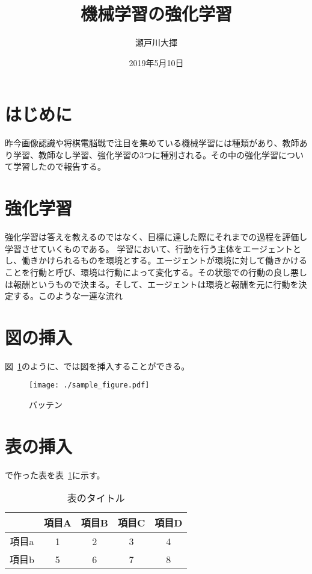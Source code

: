 \documentclass[10pt, a4j, uplatex, dvipdfmx, twocolumn]{jsarticle}
\title{機械学習の強化学習}   %
\author{瀬戸川大揮}                                %
\date{2019年5月10日}                            %
\begin{document}
\maketitle

\section{はじめに}

昨今画像認識や将棋電脳戦で注目を集めている機械学習には種類があり、教師あり学習、教師なし学習、強化学習の3つに種別される。その中の強化学習について学習したので報告する。

\section{強化学習}

強化学習は答えを教えるのではなく、目標に達した際にそれまでの過程を評価し学習させていくものである。
学習において、行動を行う主体をエージェントとし、働きかけられるものを環境とする。エージェントが環境に対して働きかけることを行動と呼び、環境は行動によって変化する。その状態での行動の良し悪しは報酬というもので決まる。そして、エージェントは環境と報酬を元に行動を決定する。このような一連な流れ

\section{図の挿入}

図~\ref{バッテンのラベル}のように、\pLaTeX では図を挿入することができる。
\begin{figure}[bp]
  \centering
  \texttt{[image: ./sample\_figure.pdf]}
  \caption{バッテン}
  \label{バッテンのラベル}
\end{figure}

\section{表の挿入}

\pLaTeX で作った表を表~\ref{表のラベル}に示す。
\begin{table}[bp]
  \centering
  \caption{表のタイトル}
  \label{表のラベル}
  \begin{tabular}{c|cccc}
    \hline
          & 項目A & 項目B & 項目C & 項目D \\
    \hline \hline
    項目a & 1     & 2     & 3     & 4 \\
    項目b & 5     & 6     & 7     & 8 \\
    \hline
  \end{tabular}
\end{table}
\end{document}

